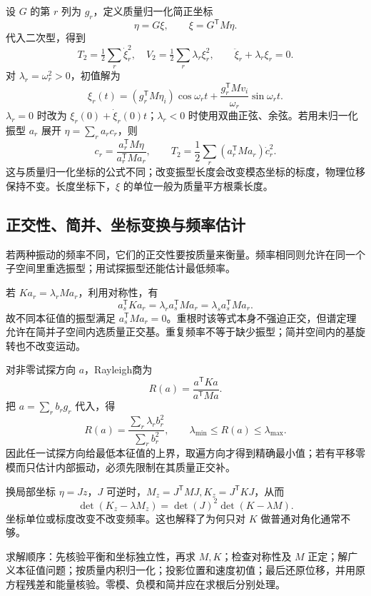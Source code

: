 设 $G$ 的第 $r$ 列为 $g_r$，定义质量归一化简正坐标
\begin{equation}
\eta=G\xi,\qquad \xi=G^{\mathsf T}M\eta.
\label{eq:normal-coordinates}
\end{equation}
代入二次型，得到
\[
T_2=\tfrac12\sum_r\dot\xi_r^2,\quad V_2=\tfrac12\sum_r\lambda_r\xi_r^2,
\qquad \ddot\xi_r+\lambda_r\xi_r=0.
\]
对 $\lambda_r=\omega_r^2>0$，初值解为
\begin{equation}
\xi_r(t)=(g_r^{\mathsf T}M\eta_i)\cos\omega_rt+
\frac{g_r^{\mathsf T}Mv_i}{\omega_r}\sin\omega_rt.
\label{eq:general-solution}
\end{equation}
$\lambda_r=0$ 时改为 $\xi_r(0)+\dot\xi_r(0)t$；$\lambda_r<0$ 时使用双曲正弦、余弦。若用未归一化振型 $a_r$ 展开 $\eta=\sum_r a_r c_r$，则
\[
c_r=\frac{a_r^{\mathsf T}M\eta}{a_r^{\mathsf T}Ma_r},\qquad
T_2=\frac12\sum_r(a_r^{\mathsf T}Ma_r)\dot c_r^2.
\]
这与质量归一化坐标的公式不同；改变振型长度会改变模态坐标的标度，物理位移保持不变。长度坐标下，$\xi$ 的单位一般为质量平方根乘长度。

\subsection{正交性、简并、坐标变换与频率估计}
若两种振动的频率不同，它们的正交性要按质量来衡量。频率相同则允许在同一个子空间里重选振型；用试探振型还能估计最低频率。

若 $Ka_r=\lambda_rMa_r$，利用对称性，有
\[
a_s^{\mathsf T}Ka_r=\lambda_r a_s^{\mathsf T}Ma_r
=\lambda_s a_s^{\mathsf T}Ma_r.
\]
故不同本征值的振型满足 $a_s^{\mathsf T}Ma_r=0$。重根时该等式本身不强迫正交，但谱定理允许在简并子空间内选质量正交基。重复频率不等于缺少振型；简并空间内的基旋转也不改变运动。

对非零试探方向 $a$，Rayleigh商为
\[
R(a)=\frac{a^{\mathsf T}Ka}{a^{\mathsf T}Ma}.
\]
把 $a=\sum_r b_rg_r$ 代入，得
\[
R(a)=\frac{\sum_r\lambda_rb_r^2}{\sum_r b_r^2},\qquad
\lambda_{\min}\le R(a)\le\lambda_{\max}.
\]
因此任一试探方向给最低本征值的上界，取遍方向才得到精确最小值；若有平移零模而只估计内部振动，必须先限制在其质量正交补。

换局部坐标 $\eta=Jz$，$J$ 可逆时，$M_z=J^{\mathsf T}MJ,K_z=J^{\mathsf T}KJ$，从而
\[
\det(K_z-\lambda M_z)=\det(J)^2\det(K-\lambda M).
\]
坐标单位或标度改变不改变频率。这也解释了为何只对 $K$ 做普通对角化通常不够。

\begin{keybox}
求解顺序：先核验平衡和坐标独立性，再求 $M,K$；检查对称性及 $M$ 正定；解广义本征值问题；按质量内积归一化；投影位置和速度初值；最后还原位移，并用原方程残差和能量核验。零模、负模和简并应在求根后分别处理。
\end{keybox}

